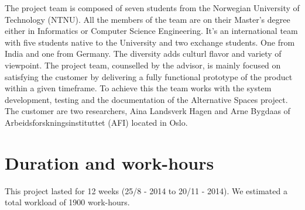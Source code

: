 The project team is composed of seven students from the Norwegian University of Technology (NTNU). All the members of the team are on their Master's degree either in Informatics or Computer Science Engineering. It's an international team with five students native to the University and two exchange students. One from India and one from Germany. The diversity adds culturl flavor and variety of viewpoint. The project team, counselled by the advisor, is mainly focused on satisfying the customer by delivering a fully functional prototype of the product within a given timeframe. To achieve this the team works with the system development, testing and the documentation of the Alternative Spaces project. 
The customer are two researchers, Aina Landsverk Hagen and Arne Bygdaas of Arbeidsforskningsinstituttet (AFI) located in Oslo. 

\section{Duration and work-hours} This project lasted for 12 weeks (25/8 - 2014 to 20/11 - 2014). We estimated a total workload of 1900 work-hours.
